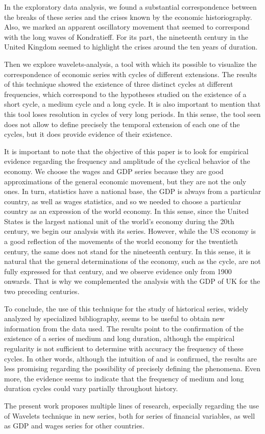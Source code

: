 \documentclass[a4paper,10cpi]{article}
\begin{document}
	In the exploratory data analysis, we found a substantial correspondence between the breaks of these series and the crises known by the economic historiography. Also, we marked an apparent oscillatory movement that seemed to correspond with the long waves of Kondratieff. For its part, the nineteenth century in the United Kingdom seemed to highlight the crises around the ten years of duration.
	
	Then we explore wavelets-analysis, a tool with which its possible to visualize the correspondence of economic series with cycles of different extensions. The results of this technique showed the existence of three distinct cycles at different frequencies, which correspond to the hypotheses studied on the existence of a short cycle, a medium cycle and a long cycle. It is also important to mention that this tool loses resolution in cycles of very long periods. In this sense, the tool seen does not allow to define precisely the temporal extension of each one of the cycles, but it does provide evidence of their existence.
	
	It is important to note that the objective of this paper is to look for empirical evidence regarding the frequency and amplitude of the cyclical behavior of the economy. We choose the wages and GDP series because they are good approximations of the general economic movement, but they are not the only ones. In turn, statistics have a national base, the GDP is always from a particular country, as well as wages statistics, and so we needed to choose a particular country as an expression of the world economy. In this sense, since the United States is the largest national unit of the world's economy during the 20th century, we begin our analysis with its series. However, while the US economy is a good reflection of the movements of the world economy for the twentieth century, the same does not stand for the nineteenth century. In this sense, it is natural that the general determinations of the economy, such as the cycle, are not fully expressed for that century, and we observe evidence only from 1900 onwards. That is why we complemented the analysis with the GDP of UK for the two preceding centuries.
	
	To conclude, the use of this technique for the study of historical series, widely analyzed by specialized bibliography, seems to be useful to obtain new information from the data used. The results point to the confirmation of the existence of a series of medium and long duration, although the empirical regularity is not sufficient to determine with accuracy the frequency of these cycles. In other words, although the intuition of \cite{kuznets1930secular} and \cite{kondratieff1979long} is confirmed, the results are less promising regarding the possibility of precisely defining the phenomena. Even more, the evidence seems to indicate that the frequency of medium and long duration cycles could vary partially throughout history.
	
	The present work proposes multiple lines of research, especially regarding the use of Wavelets technique in new series, both for series of financial variables, as well as GDP and wages series for other countries.
	
	\mbox{}\\
	
	
	
	
	
\end{document}

